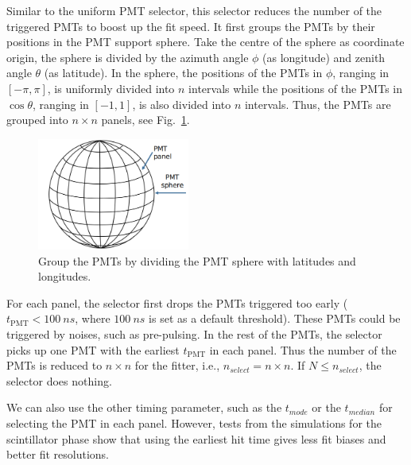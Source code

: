 \begin{itemize}
Similar to the uniform PMT selector, this selector reduces the number of the triggered PMTs to boost up the fit speed. It first groups the PMTs by their positions in the PMT support sphere. Take the centre of the sphere as coordinate origin, the sphere is divided by the azimuth angle $\phi$ (as longitude) and zenith angle $\theta$ (as latitude). In the sphere, the positions of the PMTs in $\phi$, ranging in $[-\pi,\pi]$, is uniformly divided into $n$ intervals while the positions of the PMTs in $\cos\theta$, ranging in $[-1, 1]$, is also divided into $n$ intervals. Thus, the PMTs are grouped into $n\times n$ panels, see Fig.~\ref{GroupPMTs}. 
\begin{figure}[!htb]
	\centering
	\includegraphics[width=5cm]{GroupPMTs.png}
	\caption{Group the PMTs by dividing the PMT sphere with latitudes and longitudes.}
	\label{GroupPMTs}
\end{figure}

For each panel, the selector first drops the PMTs triggered too early ($t_\mathrm{PMT}<100~ns$, where $100~ns$ is set as a default threshold). These PMTs could be triggered by noises, such as pre-pulsing. In the rest of the PMTs, the selector picks up one PMT with the earliest $t_\mathrm{PMT}$ in each panel. Thus the number of the PMTs is reduced to $n\times n$ for the fitter, i.e., $n_{select}=n\times n$. If $N\leq n_{select}$, the selector does nothing. 

We can also use the other timing parameter, such as the $t_{mode}$ or the $t_{median}$ for selecting the PMT in each panel. However, tests from the simulations for the scintillator phase show that using the earliest hit time gives less fit biases and better fit resolutions.
\end{itemize}